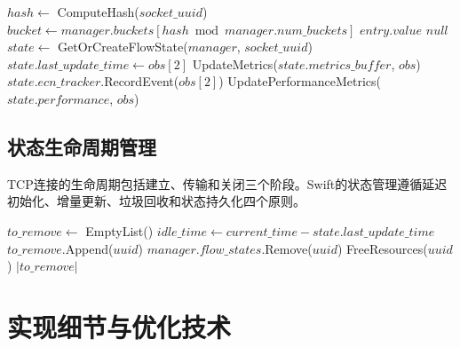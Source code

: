 \begin{algorithm}[htbp]
\caption{流状态查找与更新}
\begin{algorithmic}[1]
    \State $hash \leftarrow$ ComputeHash($socket\_uuid$)
    \State $bucket \leftarrow manager.buckets[hash \bmod manager.num\_buckets]$
            \State \Return $entry.value$
        \EndIf
    \EndFor
    \State \Return $null$ 
\EndFunction
{}
    \State $state \leftarrow$ GetOrCreateFlowState($manager$, $socket\_uuid$)
    \State $state.last\_update\_time \leftarrow obs[2]$
    \State UpdateMetrics($state.metrics\_buffer$, $obs$)
        \State $state.ecn\_tracker$.RecordEvent($obs[2]$)
    \EndIf
    \State UpdatePerformanceMetrics($state.performance$, $obs$)
\EndFunction
\end{algorithmic}
\end{algorithm}

\subsection{状态生命周期管理}

TCP连接的生命周期包括建立、传输和关闭三个阶段。Swift的状态管理遵循延迟初始化、增量更新、垃圾回收和状态持久化四个原则。

\begin{algorithm}[htbp]
\caption{流状态垃圾回收}
\begin{algorithmic}[1]
    \State $to\_remove \leftarrow$ EmptyList()
        \State $idle\_time \leftarrow current\_time - state.last\_update\_time$
            \State $to\_remove$.Append($uuid$)
        \EndIf
    \EndFor
        \State $manager.flow\_states$.Remove($uuid$)
        \State FreeResources($uuid$)
    \EndFor
    \State \Return $|to\_remove|$
\EndFunction
\end{algorithmic}
\end{algorithm}

\section{实现细节与优化技术}

